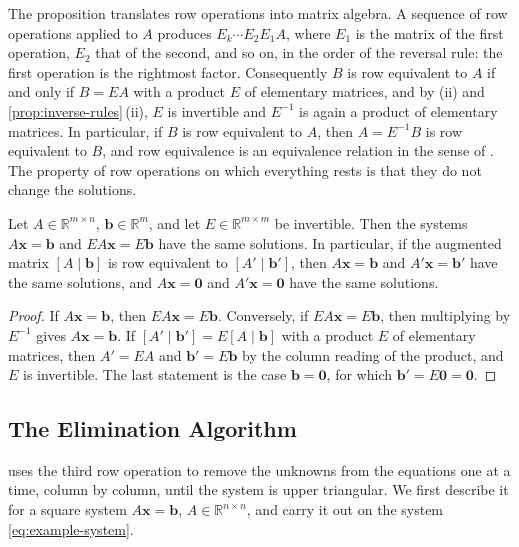The proposition translates row operations into matrix algebra. A sequence of row operations applied to $A$ produces $E_k\cdots E_2E_1A$, where $E_1$ is the matrix of the first operation, $E_2$ that of the second, and so on, in the order of the reversal rule: the first operation is the rightmost factor. Consequently $B$ is row equivalent to $A$ if and only if $B=EA$ with a product $E$ of elementary matrices, and by (ii) and \cref{prop:inverse-rules}\,(ii), $E$ is invertible and $E^{-1}$ is again a product of elementary matrices. In particular, if $B$ is row equivalent to $A$, then $A=E^{-1}B$ is row equivalent to $B$, and row equivalence is an equivalence relation in the sense of . The property of row operations on which everything rests is that they do not change the solutions.

\begin{theorem}
\label{thm:row-equivalence}
Let $A\in\mathbb R^{m\times n}$, $\mathbf b\in\mathbb R^m$, and let $E\in\mathbb R^{m\times m}$ be invertible. Then the systems $A\mathbf x=\mathbf b$ and $EA\mathbf x=E\mathbf b$ have the same solutions. In particular, if the augmented matrix $[A\mid\mathbf b]$ is row equivalent to $[A'\mid\mathbf b']$, then $A\mathbf x=\mathbf b$ and $A'\mathbf x=\mathbf b'$ have the same solutions, and $A\mathbf x=\mathbf 0$ and $A'\mathbf x=\mathbf 0$ have the same solutions.
\end{theorem}

\begin{proof}
If $A\mathbf x=\mathbf b$, then $EA\mathbf x=E\mathbf b$. Conversely, if $EA\mathbf x=E\mathbf b$, then multiplying by $E^{-1}$ gives $A\mathbf x=\mathbf b$. If $[A'\mid\mathbf b']=E[A\mid\mathbf b]$ with a product $E$ of elementary matrices, then $A'=EA$ and $\mathbf b'=E\mathbf b$ by the column reading of the product, and $E$ is invertible. The last statement is the case $\mathbf b=\mathbf 0$, for which $\mathbf b'=E\mathbf 0=\mathbf 0$.
\end{proof}

\subsection{The Elimination Algorithm}

 uses the third row operation to remove the unknowns from the equations one at a time, column by column, until the system is upper triangular. We first describe it for a square system $A\mathbf x=\mathbf b$, $A\in\mathbb R^{n\times n}$, and carry it out on the system \eqref{eq:example-system}.

